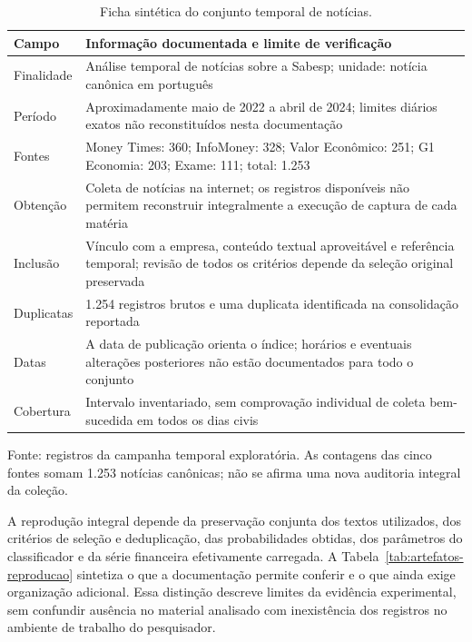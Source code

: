 \begin{table}[H]
\centering
\caption{Ficha sintética do conjunto temporal de notícias.}
\label{tab:ficha-corpus}
\begingroup
\renewcommand{\dissertacaotabelaparams}{%
  \setlength{\tabcolsep}{3pt}%
  \setlength{\extrarowheight}{0pt}%
  \renewcommand{\arraystretch}{1.04}%
}
\footnotesize
\begin{tabularx}{\textwidth}{@{}P{0.25\textwidth}L@{}}
\toprule
Campo & Informação documentada e limite de verificação \\
\midrule
Finalidade & Análise temporal de notícias sobre a Sabesp; unidade: notícia canônica em português \\
Período & Aproximadamente maio de 2022 a abril de 2024; limites diários exatos não reconstituídos nesta documentação \\
Fontes & Money Times: 360; InfoMoney: 328; Valor Econômico: 251; G1 Economia: 203; Exame: 111; total: 1.253 \\
Obtenção & Coleta de notícias na internet; os registros disponíveis não permitem reconstruir integralmente a execução de captura de cada matéria \\
Inclusão & Vínculo com a empresa, conteúdo textual aproveitável e referência temporal; revisão de todos os critérios depende da seleção original preservada \\
Duplicatas & 1.254 registros brutos e uma duplicata identificada na consolidação reportada \\
Datas & A data de publicação orienta o índice; horários e eventuais alterações posteriores não estão documentados para todo o conjunto \\
Cobertura & Intervalo inventariado, sem comprovação individual de coleta bem-sucedida em todos os dias civis \\
\bottomrule
\end{tabularx}
\par\smallskip
{\footnotesize Fonte: registros da campanha temporal exploratória. As contagens das cinco fontes somam 1.253 notícias canônicas; não se afirma uma nova auditoria integral da coleção.}
\endgroup
\end{table}

A reprodução integral depende da preservação conjunta dos textos utilizados, dos critérios de seleção e deduplicação, das probabilidades obtidas, dos parâmetros do classificador e da série financeira efetivamente carregada. A Tabela~\ref{tab:artefatos-reproducao} sintetiza o que a documentação permite conferir e o que ainda exige organização adicional. Essa distinção descreve limites da evidência experimental, sem confundir ausência no material analisado com inexistência dos registros no ambiente de trabalho do pesquisador.


